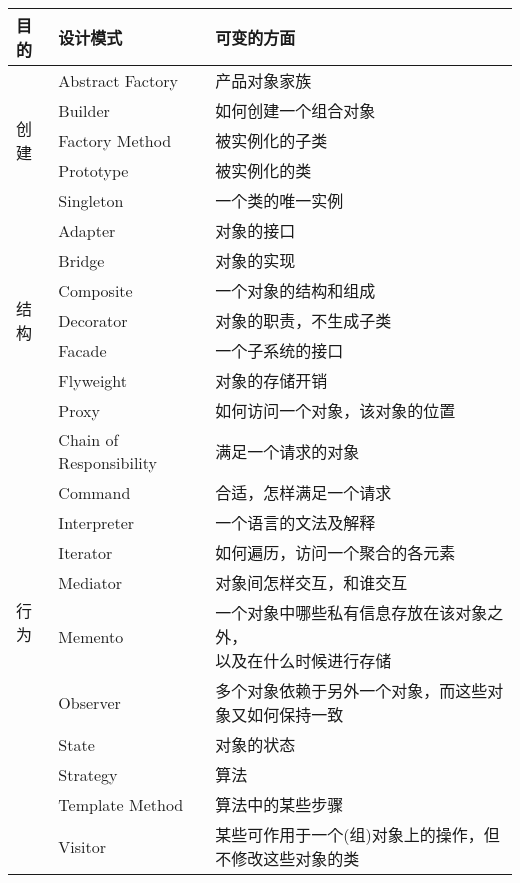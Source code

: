 \begin{center}
    \small
    \setlength{\tabcolsep}{3mm}
    \begin{longtable}{l|l|l}
        \toprule
        \textbf{目的} & \textbf{设计模式} & \textbf{可变的方面}\\
        \midrule
        \multirow{5}{*}{创建}& Abstract Factory & 产品对象家族 \\
        & Builder & 如何创建一个组合对象 \\
        & Factory Method & 被实例化的子类 \\
        & Prototype & 被实例化的类 \\
        & Singleton & 一个类的唯一实例 \\
        \midrule
        \multirow{7}{*}{结构} & Adapter & 对象的接口 \\
        & Bridge & 对象的实现 \\
        & Composite & 一个对象的结构和组成\\
        & Decorator & 对象的职责，不生成子类 \\
        & Facade & 一个子系统的接口 \\
        & Flyweight & 对象的存储开销 \\
        & Proxy & 如何访问一个对象，该对象的位置 \\
        \midrule
        \multirow{10}{*}{行为} & Chain of Responsibility & 满足一个请求的对象 \\
        & Command & 合适，怎样满足一个请求 \\
        & Interpreter & 一个语言的文法及解释 \\
        & Iterator & 如何遍历，访问一个聚合的各元素 \\
        & Mediator & 对象间怎样交互，和谁交互 \\
        & Memento & \makecell[l]{一个对象中哪些私有信息存放在该对象之外，\\以及在什么时候进行存储} \\
        & Observer & 多个对象依赖于另外一个对象，而这些对象又如何保持一致 \\
        & State & 对象的状态 \\
        & Strategy & 算法 \\
        & Template Method & 算法中的某些步骤 \\
        & Visitor & 某些可作用于一个(组)对象上的操作，但不修改这些对象的类 \\
        \bottomrule
    \end{longtable}
\end{center}

\newpage